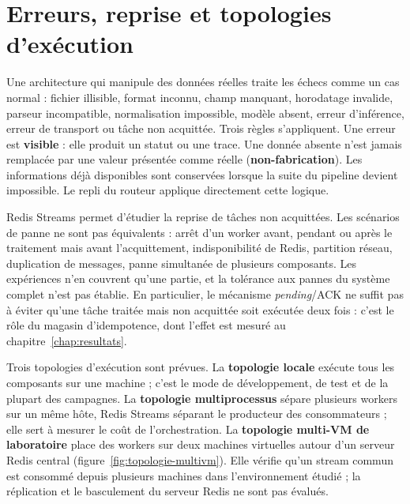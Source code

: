 \section{Erreurs, reprise et topologies d'exécution}

\label{sec:erreurs-topologies}

Une architecture qui manipule des données réelles traite les échecs comme un cas normal : fichier illisible, format inconnu, champ manquant, horodatage invalide, parseur incompatible, normalisation impossible, modèle absent, erreur d'inférence, erreur de transport ou tâche non acquittée. Trois règles s'appliquent. Une erreur est \textbf{visible} : elle produit un statut ou une trace. Une donnée absente n'est jamais remplacée par une valeur présentée comme réelle (\textbf{non-fabrication}). Les informations déjà disponibles sont conservées lorsque la suite du pipeline devient impossible. Le repli du routeur applique directement cette logique.

Redis Streams permet d'étudier la reprise de tâches non acquittées. Les scénarios de panne ne sont pas équivalents : arrêt d'un worker avant, pendant ou après le traitement mais avant l'acquittement, indisponibilité de Redis, partition réseau, duplication de messages, panne simultanée de plusieurs composants. Les expériences n'en couvrent qu'une partie, et la tolérance aux pannes du système complet n'est pas établie. En particulier, le mécanisme \textit{pending}/ACK ne suffit pas à éviter qu'une tâche traitée mais non acquittée soit exécutée deux fois : c'est le rôle du magasin d'idempotence, dont l'effet est mesuré au chapitre~\ref{chap:resultats}.

Trois topologies d'exécution sont prévues. La \textbf{topologie locale} exécute tous les composants sur une machine ; c'est le mode de développement, de test et de la plupart des campagnes. La \textbf{topologie multiprocessus} sépare plusieurs workers sur un même hôte, Redis Streams séparant le producteur des consommateurs ; elle sert à mesurer le coût de l'orchestration. La \textbf{topologie multi-VM de laboratoire} place des workers sur deux machines virtuelles autour d'un serveur Redis central (figure~\ref{fig:topologie-multivm}). Elle vérifie qu'un stream commun est consommé depuis plusieurs machines dans l'environnement étudié ; la réplication et le basculement du serveur Redis ne sont pas évalués.

